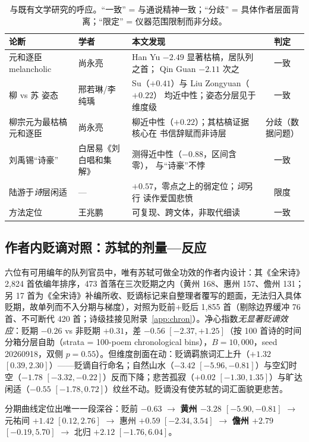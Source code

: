 \documentclass[11pt]{article}
\begin{document}
\begin{table}[H]
\centering\small
\caption{与既有文学研究的呼应。“一致” = 与通说精神一致；“分歧” = 具体作者层面背离；“限定” = 仪器范围限制而非分歧。}
\label{tab:lit}
\begin{tabular}{lp{2.6cm}p{2.3cm}c}
\toprule
论断 & 学者 & 本文发现 & 判定\\
\midrule
元和逐臣 melancholic & 尚永亮 & Han Yu $-2.49$ 显著枯槁，居队列之首；
Qin Guan $-2.11$ 次之 & 一致\\
柳 vs 苏 姿态 & 邢若琳/李纯瑀 & Su（$+0.41$）与 Liu Zongyuan（$+0.22$）
均近中性；姿态分层见于维度级 & 一致\\
柳宗元为最枯槁元和逐臣 & 尚永亮 & 柳近中性（$+0.22$）；其枯槁证据核心在
书信辞赋而非诗层 & 分歧（数据问题）\\
刘禹锡“诗豪” & 白居易《刘白唱和集解》 & 测得近中性（$-0.88$，区间含零），
与“诗豪”不悖 & 一致\\
陆游于\emph{诗}层闲适 & --- & $+0.57$，零点之上的弱定位；\emph{词}另行
读作爱国悲愤 & 限度\\
方法定位 & 王兆鹏 \citep{wang2008finding} & 可复现、跨文体，非取代细读 & 一致\\
\bottomrule
\end{tabular}
\end{table}

\subsection{作者内贬谪对照：苏轼的剂量—反应}
\label{sec:profiles:exile}
六位有可用编年的队列官员中，唯有苏轼可做全功效的作者内设计：其《全宋诗》2{,}824 首依编年排序，473 首落在三次贬期之内（黄州 168、惠州 157、儋州 131；另 17 首为《全宋诗》补编所收、贬谪标记来自整理者覆写的题面，无法归入具体贬期，故单列而不入分期与梯度），对照为贬前+贬后 1{,}855 首（剔除边界缓冲 76 首、不可断代 420 首；诗级挂接见附录~\ref{app:chron}）。净心指数\emph{无显著贬谪效应}：贬期 $-0.26$ vs 非贬期 $+0.31$，差 $-0.56$ $[-2.37,+1.25]$（按 100 首诗的时间分箱分层自助（strata = 100-poem chronological bins），$B{=}10{,}000$，seed 20260918，双侧 $p{=}0.55$）。但维度剖面在动：贬谪羁旅词汇上升（$+1.32$ $[0.39,2.30]$）——贬谪自行命名；自然山水（$-3.42$ $[-5.96,-0.81]$）与空幻时空（$-1.78$ $[-3.32,-0.22]$）反而下降；悲苦孤寂（$+0.02$ $[-1.30,1.35]$）与旷达闲适（$-0.55$ $[-1.78,0.72]$）纹丝不动。贬谪没有使苏轼的词汇面貌更悲苦。

分期曲线定位出唯一一段深谷：贬前 $-0.63$ $\to$ \textbf{黄州 $-3.28$ $[-5.90,-0.81]$} $\to$ 元祐间 $+1.42$ $[0.12,2.76]$ $\to$ 惠州 $+0.59$ $[-2.34,3.54]$ $\to$ \textbf{儋州 $+2.79$ $[-0.19,5.70]$} $\to$ 北归 $+2.12$ $[-1.76,6.04]$。
\end{document}
